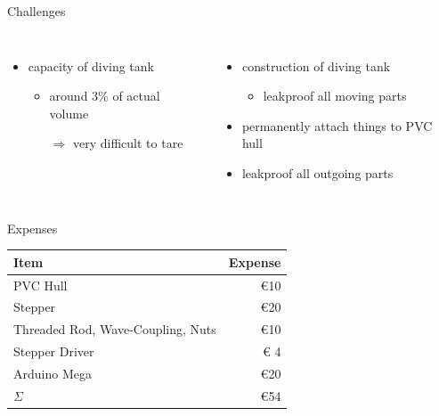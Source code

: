 \documentclass{beamer}
\begin{document}
	\begin{frame}{Challenges}
		\begin{columns}
				\begin{itemize}
					\item capacity of diving tank
						\begin{itemize}
							\item around 3\% of actual volume
							\item[$\Rightarrow$] very difficult to tare
						\end{itemize}
				\end{itemize}
				\begin{itemize}
					\item construction of diving tank
						\begin{itemize}
							\item leakproof all moving parts
						\end{itemize}
					\item permanently attach things to PVC hull
					\item leakproof all outgoing parts
				\end{itemize}
		\end{columns}
	\end{frame}
	
	\begin{frame}{Expenses}
		\begin{center}
			\begin{tabular}{|lr|}
				\hline
				Item & Expense \\\hline
				PVC Hull & \euro{10}\\
				Stepper & \euro{20}\\
				Threaded Rod, Wave-Coupling, Nuts & \euro{10}\\
				Stepper Driver & \euro{ 4}\\
				Arduino Mega & \euro{20}\\\hline
				$\Sigma$ & \euro{54}\\
				\hline
			\end{tabular}
		\end{center}
	\end{frame}
\end{document}
